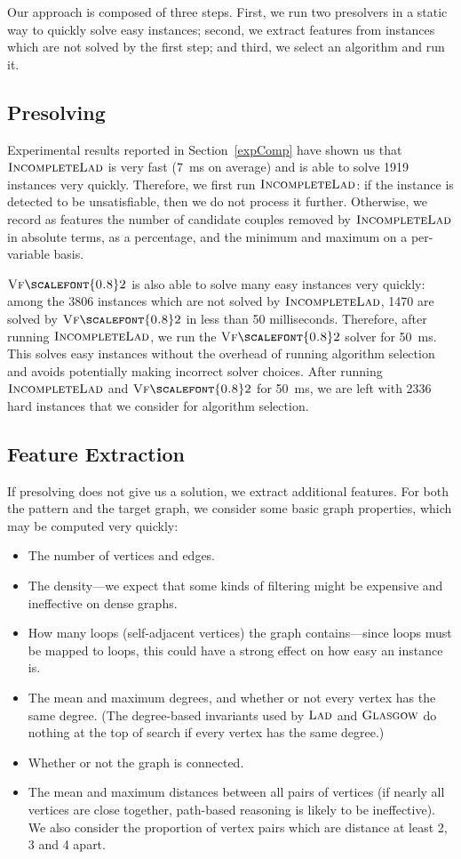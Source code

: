 \documentclass{llncs}
\newcommand{\VFtwo}{$\textsc{Vf{\scalefont{0.8}2}}$\xspace}
\newcommand{\Glasgow}{$\textsc{Glasgow}$\xspace}
\newcommand{\LAD}{$\textsc{Lad}$\xspace}
\newcommand{\IncompleteLAD}{$\textsc{IncompleteLad}$\xspace}
\begin{document}
Our approach is composed of three steps. First, we run two presolvers in a static way to quickly
solve easy instances; second, we extract features from instances which are not solved by the first
step; and third, we select an algorithm and run it.

\subsection{Presolving}

Experimental results reported in Section~\ref{expComp} have shown us that \IncompleteLAD is very fast
(\SI{7}{\ms} on average) and is able to solve 1919 instances very quickly. Therefore, we first run
\IncompleteLAD: if the instance is detected to be unsatisfiable, then we do not process it further.
Otherwise, we record as features the number of candidate couples removed by \IncompleteLAD in absolute
terms, as a percentage, and the minimum and maximum on a per-variable basis.

\VFtwo is also able to solve many easy instances very quickly: among the 3806 instances which are not
solved by \IncompleteLAD, 1470 are solved by \VFtwo in less than 50 milliseconds. Therefore, after
running \IncompleteLAD, we run the \VFtwo solver for \SI{50}{\ms}. This solves easy instances without
the overhead of running algorithm selection and avoids potentially making incorrect solver choices.
After running \IncompleteLAD and \VFtwo for \SI{50}{\ms}, we are left with 2336 hard instances that we
consider for algorithm selection.

\subsection{Feature Extraction}

If presolving does not give us a solution, we extract additional features. For both the pattern and
the target graph, we consider some basic graph properties, which may be computed very quickly:

\begin{itemize}
    \item The number of vertices and edges.
    \item The density---we expect that some kinds of filtering might be expensive and ineffective on
        dense graphs.
    \item How many loops (self-adjacent vertices) the graph contains---since loops must be mapped to
        loops, this could have a strong effect on how easy an instance is.
    \item The mean and maximum degrees, and whether or not every vertex has the same degree. (The
        degree-based invariants used by \LAD and \Glasgow do nothing at the top of search if every
        vertex has the same degree.)
    \item Whether or not the graph is connected.
    \item The mean and maximum distances between all pairs of vertices (if nearly all vertices are
        close together, path-based reasoning is likely to be ineffective). We also consider the
        proportion of vertex pairs which are distance at least 2, 3 and 4 apart.
\end{itemize}
\end{document}
